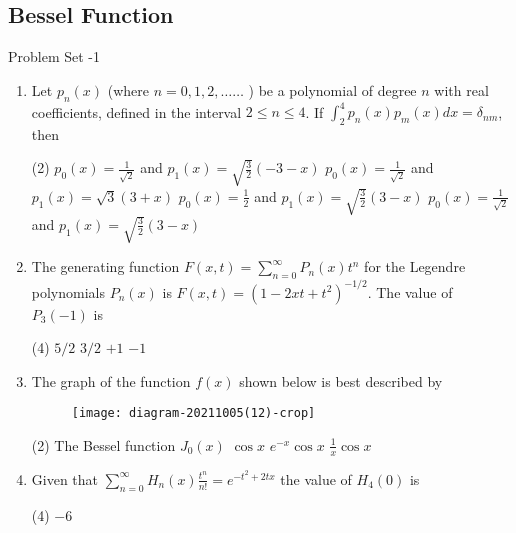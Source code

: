 \subsection{Bessel Function}
\newpage
\begin{abox}
	Problem Set -1
\end{abox}
\begin{enumerate}[label=\color{ocre}\textbf{\arabic*.}]
	\item  Let $p_{n}(x)$ (where $n=0,1,2, \ldots \ldots$ ) be a polynomial of degree $n$ with real coefficients, defined in the interval $2 \leq n \leq 4$. If $\int_{2}^{4} p_{n}(x) p_{m}(x) d x=\delta_{n m}$, then
	{}
	\begin{tasks}(2)
		\task[\textbf{A.}] $p_{0}(x)=\frac{1}{\sqrt{2}}$ and $p_{1}(x)=\sqrt{\frac{3}{2}}(-3-x)$
		\task[\textbf{B.}]  $p_{0}(x)=\frac{1}{\sqrt{2}}$ and $p_{1}(x)=\sqrt{3}(3+x)$
		\task[\textbf{C.}] $p_{0}(x)=\frac{1}{2}$ and $p_{1}(x)=\sqrt{\frac{3}{2}}(3-x)$
		\task[\textbf{D.}] $p_{0}(x)=\frac{1}{\sqrt{2}}$ and $p_{1}(x)=\sqrt{\frac{3}{2}}(3-x)$
	\end{tasks}
	\item  The generating function $F(x, t)=\sum_{n=0}^{\infty} P_{n}(x) t^{n}$ for the Legendre polynomials $P_{n}(x)$ is $F(x, t)=\left(1-2 x t+t^{2}\right)^{-1 / 2}$. The value of $P_{3}(-1)$ is
	{}
	\begin{tasks}(4)
		\task[\textbf{A.}] $5 / 2$
		\task[\textbf{B.}] $3 / 2$
		\task[\textbf{C.}] $+1$
		\task[\textbf{D.}] $-1$
	\end{tasks}
	\item  The graph of the function $f(x)$ shown below is best described by
	{}
	\begin{figure}[H]
		\centering
		\texttt{[image: diagram-20211005(12)-crop]}
	\end{figure}
	\begin{tasks}(2)
		\task[\textbf{A.}]  The Bessel function $J_{0}(x)$
		\task[\textbf{B.}] $\cos x$
		\task[\textbf{C.}] $e^{-x} \cos x$
		\task[\textbf{D.}] $\frac{1}{x} \cos x$
	\end{tasks}
	\item Given that $\sum_{n=0}^{\infty} H_{n}(x) \frac{t^{n}}{n !}=e^{-t^{2}+2 t x}$ the value of $H_{4}(0)$ is
	{}
	\begin{tasks}(4)
		\task[\textbf{D.}] $-6$
	\end{tasks}

\end{enumerate}
